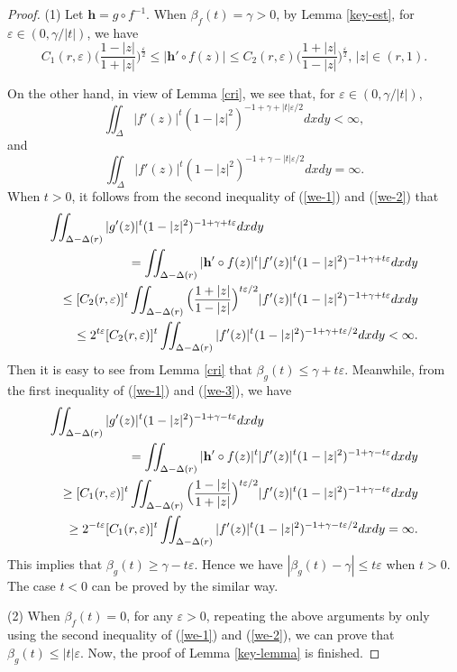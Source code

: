 \documentclass[11pt]{amsart}
\theoremstyle{remark}
\theoremstyle{claim}
\theoremstyle{definition}
\theoremstyle{problem}
\theoremstyle{conjecture}
\theoremstyle{question}
\numberwithin{equation}{section}
\begin{document}
\begin{proof}
(1) Let $\mathbf{h}=g\circ f^{-1}$. When $\beta_{f}(t)=\gamma >0$, by Lemma \ref{key-est}, for $\varepsilon\in (0, \gamma/|t|)$, we have
\begin{equation}\label{we-1}
C_1(r, \varepsilon)\Big( \frac{1-|z|}{1+|z|}\Big)^{\frac{\varepsilon}{2}}\leq |{\mathbf{h}}' \circ f(z)| \leq  C_2(r, \varepsilon) \Big( \frac{1+|z|}{1-|z|}\Big)^{\frac{\varepsilon}{2}}, \, |z|\in (r,1).
\end{equation}

On the other hand, in view of Lemma \ref{cri}, we see that, for $\varepsilon\in (0, \gamma/|t|)$,
\begin{equation}\label{we-2}
\iint_{\Delta}|f'(z)|^t (1-|z|^{2})^{-1+\gamma+|t|\varepsilon/2}dxdy<\infty,
\end{equation}
and
\begin{equation}\label{we-3}
\iint_{\Delta}|f'(z)|^t (1-|z|^{2})^{-1+\gamma-|t|\varepsilon/2}dxdy=\infty.
\end{equation}
When $t>0$, it follows from the second inequality of (\ref{we-1}) and (\ref{we-2}) that
\begin{eqnarray}
\lefteqn{\iint_{\Delta-\Delta(r)}|g'(z)|^t (1-|z|^{2})^{-1+\gamma+t\varepsilon}dxdy} \nonumber \\&&=\iint_{\Delta-\Delta(r)}|\mathbf{h}'\circ f(z)|^t |f'(z)|^t (1-|z|^{2})^{-1+\gamma+t\varepsilon}dxdy  \nonumber \\
&&\leq [C_2(r, \varepsilon)]^t \iint_{\Delta-\Delta(r)}\Big( \frac{1+|z|}{1-|z|}\Big)^{t\varepsilon/2} |f'(z)|^t (1-|z|^{2})^{-1+\gamma+t\varepsilon}dxdy \nonumber \\
&&\leq 2^{t\varepsilon}[C_2(r, \varepsilon)]^t\iint_{\Delta-\Delta(r)} |f'(z)|^t (1-|z|^{2})^{-1+\gamma+t\varepsilon/2}dxdy<\infty. \nonumber
\end{eqnarray}
Then it is easy to see from Lemma \ref{cri} that $\beta_{g}(t)\leq \gamma+t\varepsilon.$ Meanwhile, from the first  inequality of (\ref{we-1}) and (\ref{we-3}), we have
\begin{eqnarray}
\lefteqn{\iint_{\Delta-\Delta(r)}|g'(z)|^t (1-|z|^{2})^{-1+\gamma-t\varepsilon}dxdy} \nonumber \\&&=\iint_{\Delta-\Delta(r)}|\mathbf{h}'\circ f(z)|^t |f'(z)|^t (1-|z|^{2})^{-1+\gamma-t\varepsilon}dxdy  \nonumber \\
&&\geq [C_1(r, \varepsilon)]^t \iint_{\Delta-\Delta(r)}\Big( \frac{1-|z|}{1+|z|}\Big)^{t\varepsilon/2} |f'(z)|^t (1-|z|^{2})^{-1+\gamma-t\varepsilon}dxdy \nonumber \\
&&\geq 2^{-t\varepsilon}[C_1(r, \varepsilon)]^t\iint_{\Delta-\Delta(r)} |f'(z)|^t (1-|z|^{2})^{-1+\gamma-t\varepsilon/2}dxdy=\infty. \nonumber
\end{eqnarray}
This implies that $\beta_{g}(t)\geq \gamma-t\varepsilon$. Hence we have $|\beta_{g}(t)-\gamma|\leq t\varepsilon$ when $t>0$. The case $t<0$ can be proved by the similar way.

(2) When $\beta_f(t)=0$, for any $\varepsilon>0$, repeating the above arguments by only using the second inequality of (\ref{we-1}) and (\ref{we-2}), we can prove that $\beta_g(t)\leq |t|\varepsilon.$ Now, the proof of Lemma \ref{key-lemma} is finished. \end{proof}
\end{document}
